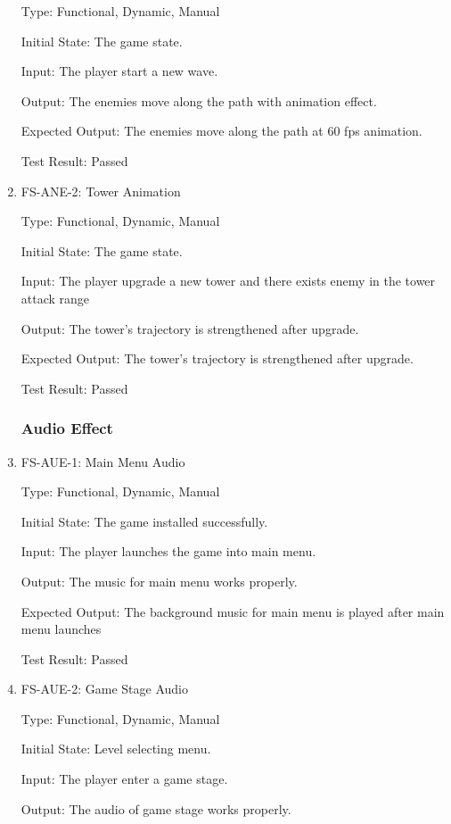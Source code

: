 \documentclass[12pt]{article}
\begin{document}
\begin{enumerate}
    Type: Functional, Dynamic, Manual
    
    Initial State: The game state.
    
    Input: The player start a new wave.
    
    Output: The enemies move along the path with animation effect.
    
    Expected Output: The enemies move along the path at 60 fps animation.
	
	Test Result: Passed
	
    
    \item{FS-ANE-2: Tower Animation}
    
    Type: Functional, Dynamic, Manual
    
    Initial State: The game state.
    
    Input: The player upgrade a new tower and there exists enemy in the tower attack range
    
    Output: The tower's trajectory is strengthened after upgrade.
    
    Expected Output: The tower's trajectory is strengthened after upgrade.
	
	Test Result: Passed
	
    
	\subsubsection{Audio Effect}
	
					
	\item{FS-AUE-1: Main Menu Audio}
					
	Type: Functional, Dynamic, Manual
					
    Initial State: The game installed successfully.
					
	Input: The player launches the game into main menu. 
					
	Output: The music for main menu works properly.
					
	Expected Output: The background music for main menu is played after main menu launches
	
	Test Result: Passed
	
	
	\item{FS-AUE-2: Game Stage Audio}
					
	Type: Functional, Dynamic, Manual
					
    Initial State: Level selecting menu.
					
	Input: The player enter a game stage.
					
	Output: The audio of game stage works properly.
					

\end{enumerate}
\end{document}
